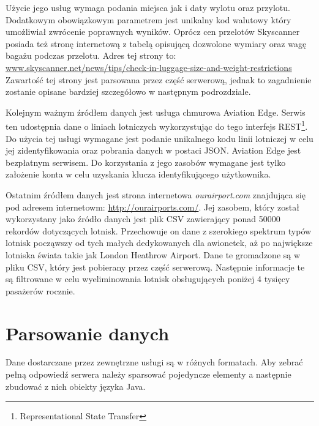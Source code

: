 \documentclass[12pt, twoside]{report}
\begin{document}
Użycie jego usług wymaga podania miejsca jak i daty wylotu oraz przylotu. Dodatkowym obowiązkowym parametrem jest unikalny kod walutowy który umożliwiał zwrócenie poprawnych wyników. Oprócz cen przelotów Skyscanner posiada też stronę internetową z tabelą opisującą dozwolone wymiary oraz wagę bagażu podczas przelotu. Adres tej strony to:\\ \url{www.skyscanner.net/news/tips/check-in-luggage-size-and-weight-restrictions}\\
Zawartość tej strony jest parsowana przez część serwerową, jednak to zagadnienie zostanie opisane bardziej szczegółowo w następnym podrozdziale.

Kolejnym ważnym źródłem danych jest usługa chmurowa Aviation Edge. Serwis ten udostępnia dane o liniach lotniczych wykorzystując do tego interfejs REST\footnote{Representational State Transfer}. Do użycia tej usługi wymagane jest podanie unikalnego kodu linii lotniczej w celu jej zidentyfikowania oraz pobrania danych w postaci JSON. Aviation Edge jest bezpłatnym serwisem. Do korzystania z jego zasobów wymagane jest tylko założenie konta w celu uzyskania klucza identyfikującego użytkownika.

Ostatnim źródłem danych jest strona internetowa \textit{ourairport.com} znajdująca się pod adresem internetowm: \url{http://ourairports.com/}. Jej zasobem, który został wykorzystany jako źródło danych jest plik CSV zawierający ponad 50000 rekordów dotyczących lotnisk. Przechowuje on dane z szerokiego spektrum typów lotnisk począwszy od tych małych dedykowanych dla awionetek, aż po największe lotniska świata takie jak London Heathrow Airport. Dane te gromadzone są w pliku CSV, który jest pobierany przez część serwerową. Następnie informacje te są filtrowane w celu wyeliminowania lotnisk obsługujących poniżej 4 tysięcy pasażerów rocznie.

\section{Parsowanie danych}
Dane dostarczane przez zewnętrzne usługi są w różnych formatach. Aby zebrać pełną odpowiedź serwera należy  sparsować pojedyncze elementy a następnie zbudować z nich obiekty języka Java.
\end{document}
